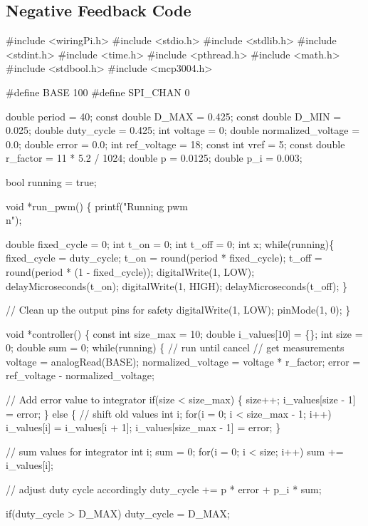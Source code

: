 \documentclass[a4paper, 12pt]{article}
\begin{document}
\newpage
\begin{appendices}
	\section{Negative Feedback Code}
	\label{sec:feedback_code}
\#include <wiringPi.h>
\#include <stdio.h>
\#include <stdlib.h>
\#include <stdint.h>
\#include <time.h>
\#include <pthread.h>
\#include <math.h>
\#include <stdbool.h>
\#include <mcp3004.h>

\#define BASE 100
\#define SPI\_CHAN 0

double period = 40;
const double D\_MAX = 0.425;
const double D\_MIN = 0.025;
double duty\_cycle = 0.425;
int voltage = 0;
double normalized\_voltage = 0.0;
double error = 0.0;
int ref\_voltage = 18;
const int vref = 5;
const double r\_factor = 11 * 5.2 / 1024;
double p = 0.0125;
double p\_i = 0.003;

bool running = true;

void *run\_pwm()
\{
	printf("Running pwm\\n");

	double fixed\_cycle = 0;
	int t\_on = 0;
	int t\_off = 0;
	int x;
	while(running)\{
		fixed\_cycle = duty\_cycle;
		t\_on = round(period * fixed\_cycle);
		t\_off = round(period * (1 - fixed\_cycle));
		digitalWrite(1, LOW);
		delayMicroseconds(t\_on);
		digitalWrite(1, HIGH);
		delayMicroseconds(t\_off);
	\}
	
	// Clean up the output pins for safety
	digitalWrite(1, LOW);
	pinMode(1, 0);
\}

void *controller()
\{
	const int size\_max = 10;
	double i\_values[10] = \{\};
	int size = 0;
	double sum = 0;
	while(running)
	\{
		// run until cancel
		// get measurements
		voltage = analogRead(BASE);
		normalized\_voltage = voltage * r\_factor;
		error = ref\_voltage - normalized\_voltage;

		// Add error value to integrator
		if(size < size\_max) \{
			size++;
			i\_values[size - 1] = error;
		\}
		else \{
			// shift old values
			int i;
			for(i = 0; i < size\_max - 1; i++)
				i\_values[i] = i\_values[i + 1];
			i\_values[size\_max - 1] = error;
		\}

		// sum values for integrator
		int i;
		sum = 0;
		for(i = 0; i < size; i++)
			sum += i\_values[i];

		// adjust duty cycle accordingly
		duty\_cycle += p * error + p\_i * sum;

		if(duty\_cycle > D\_MAX)
			duty\_cycle = D\_MAX;


\end{appendices}
\end{document}
